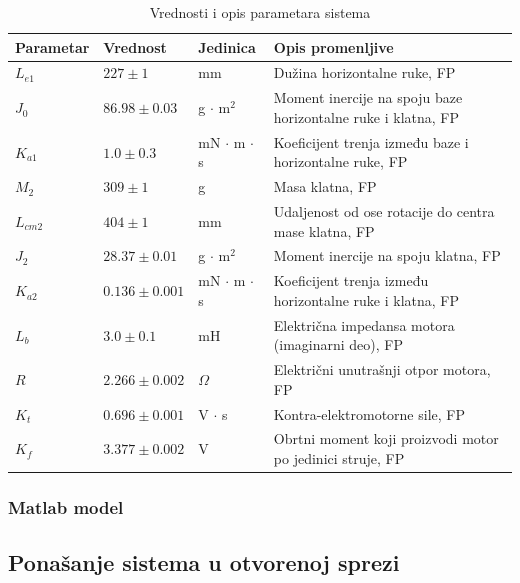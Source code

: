 \documentclass[a4paper,11pt]{article}
\theoremstyle{definition} \newtheorem{deff}{Definicija}[section]
\theoremstyle{definition} \newtheorem{prim}[deff]{Primer}
\theoremstyle{plain} \newtheorem{teor}[deff]{Teorema}
\begin{document}
	\begin{table}[ht]
		\centering
		\caption{Vrednosti i opis parametara sistema}
		\begin{tabular}{l l l l}
			\toprule
			Parametar & Vrednost & Jedinica & Opis promenljive \\
			\midrule
			$L_{e1}$ & $227 \pm 1$ & mm & Dužina horizontalne ruke, FP \\
			$J_0$ & $86.98 \pm 0.03$ & g $\cdot$ m$^2$ & Moment inercije na spoju baze horizontalne ruke i klatna, FP \\
			$K_{a1}$ & $1.0 \pm 0.3$ & mN $\cdot$ m $\cdot$ s & Koeficijent trenja između baze i horizontalne ruke, FP \\
			$M_2$ & $309 \pm 1$ & g & Masa klatna, FP \\
			$L_{cm2}$ & $404 \pm 1$ & mm & Udaljenost od ose rotacije do centra mase klatna, FP \\
			$J_2$ & $28.37 \pm 0.01$ & g $\cdot$ m$^2$ & Moment inercije na spoju klatna, FP \\
			$K_{a2}$ & $0.136 \pm 0.001$ & mN $\cdot$ m $\cdot$ s & Koeficijent trenja između horizontalne ruke i klatna, FP \\
			$L_b$ & $3.0 \pm 0.1$ & mH & Električna impedansa motora (imaginarni deo), FP \\
			$R$ & $2.266 \pm 0.002$ & $\Omega$ & Električni unutrašnji otpor motora, FP \\
			$K_t$ & $0.696 \pm 0.001$ & V $\cdot$ s & Kontra-elektromotorne sile, FP \\
			$K_f$ & $3.377 \pm 0.002$ & V & Obrtni moment koji proizvodi motor po jedinici struje, FP \\
			\bottomrule
		\end{tabular}
		\label{tab:tab1}
	\end{table}
	
	
	
	
	\subsubsection{Matlab model}
	
	
	
	
	
	
	\clearpage
	
	
	\subsection{Ponašanje sistema u otvorenoj sprezi}
	
	
	
\end{document}
